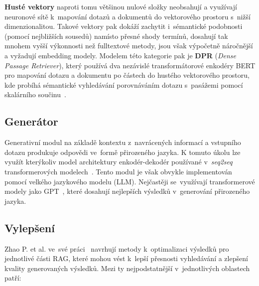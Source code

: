 \textbf{Husté vektory} naproti tomu většinou nulové složky neobsahují a využívají neuronové sítě k~mapování dotazů a dokumentů do vektorového prostoru s~nižší dimenzionalitou. Takové vektory pak dokáží zachytit i~sémantické podobnosti (pomocí nejbližších sousedů) namísto přesné shody termínů, dosahují tak mnohem vyšší výkonnosti než fulltextové metody, jsou však výpočetně náročnější a vyžadují embedding modely. Modelem této kategorie pak je \textbf{DPR} (\textit{Dense Passage Retriever}), který používá dva nezávislé transformátorové enkodéry BERT pro mapování dotazu a dokumentu po částech do hustého vektorového prostoru, kde probíhá sémantické vyhledávání porovnáváním dotazu s~pasážemi pomocí skalárního součinu~\cite{karpukhin2020dense}.

\subsection{Generátor}
Generativní modul na základě kontextu z~navrácených informací a vstupního dotazu produkuje odpovědi ve~formě přirozeného jazyka. K tomuto úkolu lze využít kterýkoliv model architektury enkodér-dekodér používané v~\textit{seq2seq} transformerových modelech~\cite{murel2024encoderdecoder}. Tento modul je však obvykle implementován pomocí velkého jazykového modelu (LLM). Nejčastěji se~využívají transformerové modely jako GPT~\cite{yenduri2023_gpt_review}, které dosahují nejlepších výsledků v~generování přirozeného jazyka.

\subsection{Vylepšení}
Zhao P. et al. ve~své práci~\cite{zhao2024rag} navrhují metody k~optimalizaci výsledků pro jednotlivé části RAG, které mohou vést k~lepší přesnosti vyhledávání a zlepšení kvality generovaných výsledků. Mezi ty nejpodstatnější v~jednotlivých oblastech patří:

